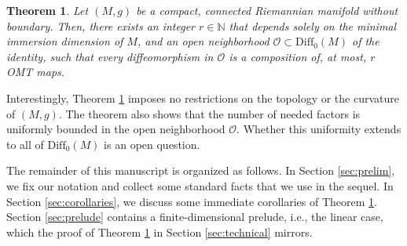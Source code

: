 \documentclass{article}
\newtheorem{theorem}{Theorem}
\theoremstyle{remark}
\newcommand{\M}{M}
\newcommand{\Diff}{\mathrm{Diff}_0(\M)}
\begin{document}
%
\begin{theorem}\label{thm:OMT_DIFF}
    Let $(\M,g)$ be a compact, connected Riemannian manifold without boundary. Then, there exists an integer $r\in\mathbb{N}$ that depends solely on the minimal immersion dimension of $\M$, and an open neighborhood $\mathcal{O}\subset\Diff$ of the identity, such that every diffeomorphism in $\mathcal{O}$ is a composition of, at most, $r$ OMT maps.
\end{theorem}
%

%
Interestingly, Theorem \ref{thm:OMT_DIFF} imposes no restrictions on the topology or the curvature of $(\M,g)$. The theorem also shows that the number of needed factors is uniformly bounded in the open neighborhood $\mathcal{O}$. Whether this uniformity extends to all of $\Diff$ is an open question.

The remainder of this manuscript is organized as follows. In Section \ref{sec:prelim}, we fix our notation and collect some standard facts that we use in the sequel. In Section \ref{sec:corollaries}, we discuss some immediate corollaries of Theorem \ref{thm:OMT_DIFF}. Section \ref{sec:prelude} contains a finite-dimensional prelude, i.e., the linear case, which the proof of Theorem \ref{thm:OMT_DIFF} in Section \ref{sec:technical} mirrors. 
\end{document}
